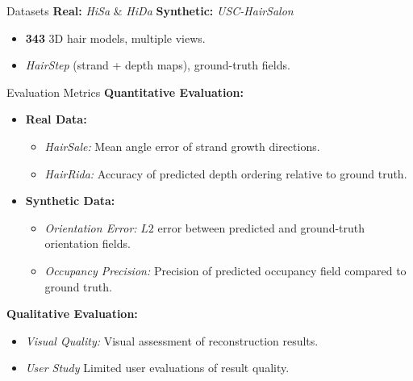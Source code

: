 
\begin{frame}[t]{Datasets}
    \textbf{Real:} \emph{HiSa} \& \emph{HiDa}
    \vspace{5pt}
    \textbf{Synthetic:} \emph{USC-HairSalon}\cite{Hu2015SingleviewHM}
    \begin{itemize}
        \item \textbf{343} 3D hair models, multiple views.
        \item \emph{HairStep} (strand + depth maps), ground-truth fields.
    \end{itemize}
\end{frame}


\begin{frame}[t]{Evaluation Metrics}
    \textbf{Quantitative Evaluation:}
    \begin{itemize}
        \item \textbf{Real Data:}
        \begin{itemize}
            \item \emph{HairSale:} Mean angle error of strand growth directions.
            \item \emph{HairRida:} Accuracy of predicted depth ordering relative to ground truth.
        \end{itemize}
        \item \textbf{Synthetic Data:}
        \begin{itemize}
            \item \emph{Orientation Error:} $L2$ error between predicted and ground-truth orientation fields.
            \item \emph{Occupancy Precision:} Precision of predicted occupancy field compared to ground truth.
        \end{itemize}
    \end{itemize}
    \vspace{4pt}
    \textbf{Qualitative Evaluation:}
    \begin{itemize}
        \item \emph{Visual Quality:} Visual assessment of reconstruction results.
        \item \emph{User Study} Limited user evaluations of result quality.
    \end{itemize}
\end{frame}



